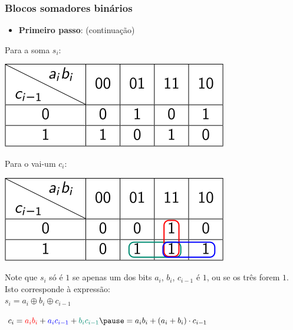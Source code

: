 \documentclass{beamer}
\begin{document}

\begin{frame}
\frametitle{Blocos somadores binários}

\begin{itemize}
\item \textbf{Primeiro passo}: (continuação)
\end{itemize}

\vspace{6pt}

\hspace{0.05\textwidth}
\begin{minipage}{0.45\textwidth}

Para a soma $s_i$:

\includegraphics{images/exemplo5_tabela_si}

\end{minipage}
%
\begin{minipage}{0.4\textwidth}

Para o vai-um $c_i$:

\includegraphics{images/exemplo5_tabela_ci}

\end{minipage}

\vspace{12pt}

\pause

Note que $s_i$ só é $1$ se apenas um dos bits $a_i$, $b_i$, $c_{i-1}$ é
$1$, ou se os três forem $1$. Isto corresponde à expressão:\\
$s_i = a_i \oplus b_i \oplus c_{i-1}$

\vspace{12pt}

\pause

$c_i = {\color{red}a_i b_i} + {\color{blue}a_i c_{i-1}} + {\color{pgr} b_i c_{i-1}} \pause = a_i b_i + (a_i + b_i ) \cdot c_{i-1}$

\end{frame}
\end{document}
